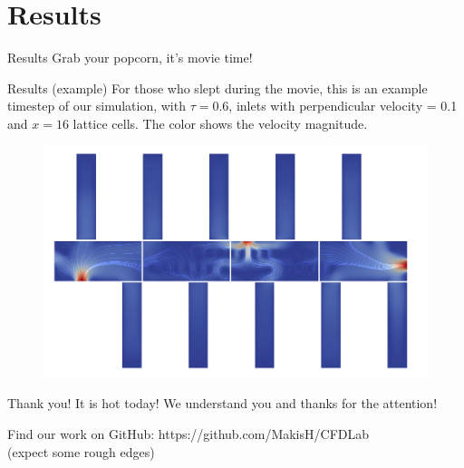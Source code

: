 \documentclass[9pt,pdftex]{beamer}
\begin{document}
\section{Results}
 \begin{frame}{Results}
  Grab your popcorn, it's movie time!
 \end{frame}
 
 \begin{frame}{Results (example)}
  For those who slept during the movie, this is an example timestep of
  our simulation, with $\tau=0.6$, inlets with perpendicular velocity = 0.1 and $x=16$ lattice cells.
  The color shows the velocity magnitude. %
  \begin{figure}
   \includegraphics[width=0.8\linewidth]{results_3inlets_streamlines}
  \end{figure}
 \end{frame}
 
 \begin{frame}{Thank you!}
  It is hot today! We understand you and thanks for the attention!
  \vspace{1cm}
  
  Find our work on GitHub: https://github.com/MakisH/CFDLab \\
  (expect some rough edges)
  
 \end{frame}



 
\end{document}
